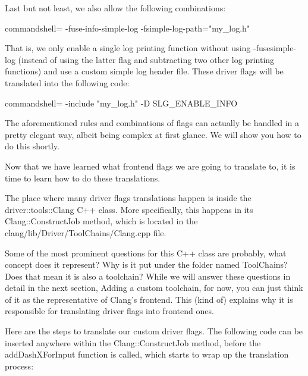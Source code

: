 \begin{itemize}
Last but not least, we also allow the following combinations:

\begin{tcblisting}{commandshell={}}
-fuse-info-simple-log -fsimple-log-path="my_log.h"
\end{tcblisting}

That is, we only enable a single log printing function without using -fusesimple-log (instead of using the latter flag and subtracting two other log printing functions) and use a custom simple log header file. These driver flags will be translated into the following code:

\begin{tcblisting}{commandshell={}}
-include "my_log.h" -D SLG_ENABLE_INFO
\end{tcblisting}

The aforementioned rules and combinations of flags can actually be handled in a pretty elegant way, albeit being complex at first glance. We will show you how to do this shortly.

\end{itemize}

Now that we have learned what frontend flags we are going to translate to, it is time to learn how to do these translations. 

The place where many driver flags translations happen is inside the driver::tools::Clang C++ class. More specifically, this happens in its Clang::ConstructJob method, which is located in the clang/lib/Driver/ToolChains/Clang.cpp file.

\begin{tcolorbox}[colback=blue!5!white,colframe=blue!75!black, fonttitle=\bfseries,title=About driver::tools::Clang]	
\hspace*{0.7cm}Some of the most prominent questions for this C++ class are probably, what concept does it represent? Why is it put under the folder named ToolChains? Does that mean it is also a toolchain? While we will answer these questions in detail in the next section, Adding a custom toolchain, for now, you can just think of it as the representative of Clang's frontend. This (kind of) explains why it is responsible for translating driver flags into frontend ones.
\end{tcolorbox}

Here are the steps to translate our custom driver flags. The following code can be inserted anywhere within the Clang::ConstructJob method, before the addDashXForInput function is called, which starts to wrap up the translation process:

